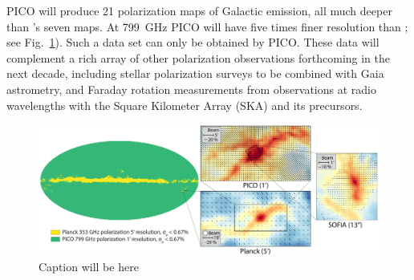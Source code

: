 \documentclass[PICOAPC.tex]{subfiles}
\begin{document}
PICO will produce 21 polarization maps of Galactic emission, all much deeper than \planck 's seven maps. At 799~GHz PICO will have five times finer resolution than \planck ; see Fig.~\ref{fig:allsky}). Such a data set can only be obtained by PICO. These data will complement a rich array of other polarization observations forthcoming in the next decade, including stellar polarization surveys to be combined with Gaia astrometry, and Faraday rotation measurements from  observations at radio wavelengths with the  Square Kilometer Array (SKA) and its precursors. \\
\begin{figure}[ht]
    \centering
    \includegraphics[width=6.5in]{galsci_fig_v4.pdf}
\vspace{-0.25in}
\caption{\captiontext Caption will be here
    \label{fig:allsky} }
\vspace{-0.10in}
\end{figure}
\end{document}
